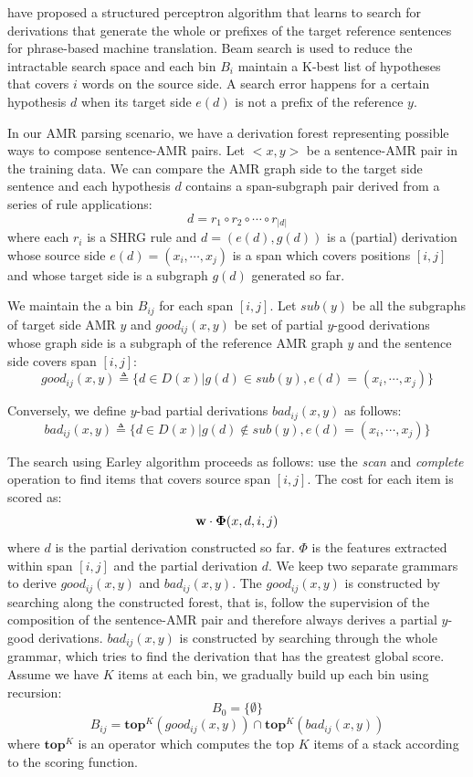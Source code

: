  have proposed a structured perceptron algorithm that learns to search for derivations that generate the whole or prefixes of the 
target reference sentences for phrase-based machine translation. Beam search is used to reduce the intractable search space and each bin $B_i$ maintain a K-best list of hypotheses that covers $i$ words
on the source side. A search error happens for a certain hypothesis $d$ when its target side $e(d)$ is not a prefix of the reference $y$.


In our AMR parsing scenario, we have a derivation forest representing possible ways to compose sentence-AMR pairs. Let $<x, y>$ be a sentence-AMR pair in the training data. We can 
compare the AMR graph side to the target side sentence and each hypothesis $d$ contains a span-subgraph pair derived from a series of rule applications:
$$d = r_1 \circ r_2 \circ \cdots \circ r_{|d|}$$
where each $r_i$ is a SHRG rule and $d=(e(d), g(d))$ is a (partial) derivation whose source side $e(d)=(x_i, \cdots , x_j)$ is a span which covers 
positions $[i, j]$ and whose target side is a subgraph $g(d)$ generated so far. 


We maintain the a bin $B_{ij}$ for each span $[i, j]$. Let $sub(y)$ be all the subgraphs
of target side AMR $y$ and $good_{ij} (x, y)$ be set of partial $y$-good derivations whose graph side is a subgraph of the reference AMR graph $y$
and the sentence side covers span $[i, j]$:
$$good_{ij}(x, y)\triangleq \{d \in D(x) | g(d) \in sub(y), e(d)=(x_i, \cdots , x_j)\}$$

Conversely, we define $y$-bad partial derivations $bad_{ij}(x,y)$ as follows:
$$bad_{ij}(x, y)\triangleq \{d \in D(x) | g(d) \notin sub(y), e(d)=(x_i, \cdots , x_j)\}$$

The search using Earley algorithm proceeds as follows: use the \textit{scan} and \textit{complete} operation to find items that covers source span $[i, j]$. 
The cost for each item is scored as: 
$${\bf w} \cdot {\bf \Phi}(x, d, i, j)$$
where $d$ is the partial derivation constructed so far. $\Phi$ is the features extracted within span $[i, j]$ and the partial derivation $d$. We keep two separate
grammars to derive $good_{ij}(x, y)$ and $bad_{ij}(x, y)$. The $good_{ij}(x, y)$ is constructed by searching along the constructed forest, that is, follow the supervision of
the composition of the sentence-AMR pair and therefore always derives a partial $y$-good derivations. $bad_{ij}(x, y)$ is constructed by searching through the whole grammar, which tries to find the derivation that has the greatest
global score. Assume we have $K$ items at each bin, we gradually build up each bin using recursion:
$$B_0 = \{ \emptyset \}$$
$$B_{ij} = \textbf{top}^K (good_{ij}(x,y)) \cap \textbf{top}^K (bad_{ij}(x,y))$$
where $\textbf{top}^K$ is an operator which computes the top $K$ items of a stack according to the scoring function.


